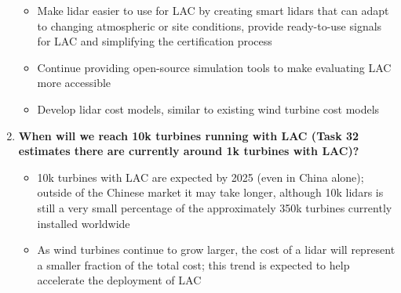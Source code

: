 \begin{enumerate}
\begin{itemize}
        \item Make lidar easier to use for LAC by creating smart lidars that can adapt to changing atmospheric or site conditions, provide ready-to-use signals for LAC and simplifying the certification process
        \item Continue providing open-source simulation tools to make evaluating LAC more accessible
        \item Develop lidar cost models, similar to existing wind turbine cost models
    \end{itemize}
    \item \textbf{When will we reach 10k turbines running with LAC (Task 32 estimates there are currently around 1k turbines with LAC)?}
    \begin{itemize}
        \item 10k turbines with LAC are expected by 2025 (even in China alone); outside of the Chinese market it may take longer, although 10k lidars is still a very small percentage of the approximately 350k turbines currently installed worldwide
        \item As wind turbines continue to grow larger, the cost of a lidar will represent a smaller fraction of the total cost; this trend is expected to help accelerate the deployment of LAC
    \end{itemize}
\end{enumerate}
        

